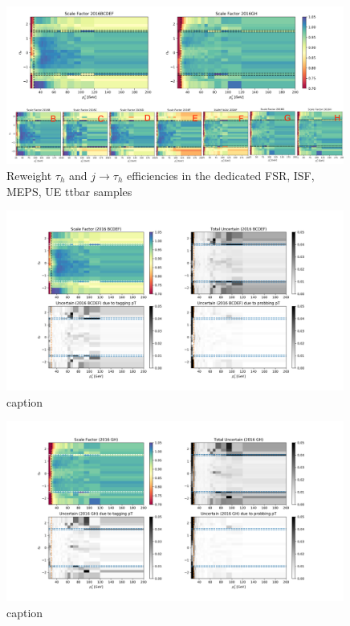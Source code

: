 \begin{figure}
    \centering
    \includegraphics[width=0.99\textwidth]{appendices/ele27TriggerEff/figures/eTrSF_value.png}
    \caption{Reweight $\tau_h$ and $j \to \tau_h$ efficiencies in the dedicated FSR, ISF, MEPS, UE ttbar samples}
    \label{fig:appendix:ele27SF}
\end{figure}





\begin{figure}
    \centering
    \includegraphics[width=0.99\textwidth]{appendices/ele27TriggerEff/figures/result_BCDEF.png}
    
    \caption{caption}
    \label{fig:appendix:ele27SF}
\end{figure}

\begin{figure}
    \centering
    \includegraphics[width=0.99\textwidth]{appendices/ele27TriggerEff/figures/result_GH.png}
    
    \caption{caption}
    \label{fig:appendix:ele27SF}
\end{figure}
